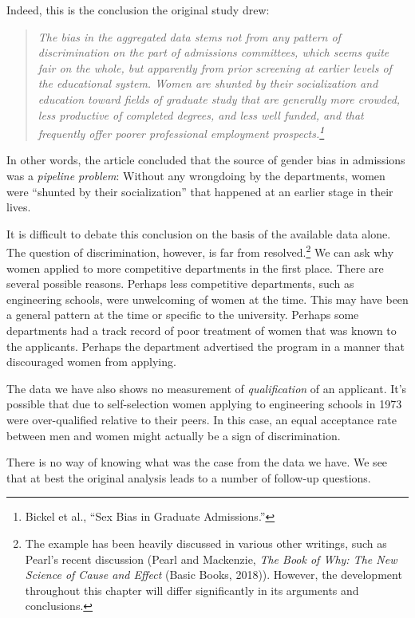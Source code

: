 \documentclass{tufte-book}
\begin{document}
Indeed, this is the conclusion the original study drew:

\begin{quote}
\emph{The bias in the aggregated data stems not from any pattern of
discrimination on the part of admissions committees, which seems quite
fair on the whole, but apparently from prior screening at earlier levels
of the educational system. Women are shunted by their socialization and
education toward fields of graduate study that are generally more
crowded, less productive of completed degrees, and less well funded, and
that frequently offer poorer professional employment
prospects.\footnote{Bickel et al., {``Sex Bias in Graduate
  Admissions.''}}}
\end{quote}

In other words, the article concluded that the source of gender bias in
admissions was a \emph{pipeline problem}: Without any wrongdoing by the
departments, women were ``shunted by their socialization'' that happened
at an earlier stage in their lives.

It is difficult to debate this conclusion on the basis of the available
data alone. The question of discrimination, however, is far from
resolved.\footnote{The example has been heavily discussed in various
  other writings, such as Pearl's recent discussion (Pearl and
  Mackenzie, \emph{The Book of Why: The New Science of Cause and Effect}
  (Basic Books, 2018)). However, the development throughout this chapter
  will differ significantly in its arguments and conclusions.} We can
ask why women applied to more competitive departments in the first
place. There are several possible reasons. Perhaps less competitive
departments, such as engineering schools, were unwelcoming of women at
the time. This may have been a general pattern at the time or specific
to the university. Perhaps some departments had a track record of poor
treatment of women that was known to the applicants. Perhaps the
department advertised the program in a manner that discouraged women
from applying.

The data we have also shows no measurement of \emph{qualification} of an
applicant. It's possible that due to self-selection women applying to
engineering schools in 1973 were over-qualified relative to their peers.
In this case, an equal acceptance rate between men and women might
actually be a sign of discrimination.

There is no way of knowing what was the case from the data we have. We
see that at best the original analysis leads to a number of follow-up
questions.
\end{document}
